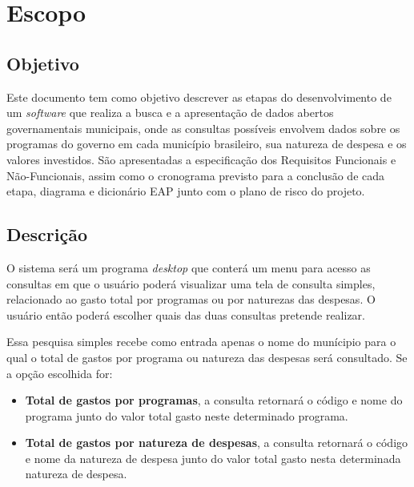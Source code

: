 \documentclass[a4paper,12pt]{article}
\begin{document}


\tableofcontents %

\thispagestyle{empty} %

\newpage
\section{Escopo}
\subsection{Objetivo}

Este documento tem como objetivo descrever as etapas do desenvolvimento de um \textit{software} que realiza a busca e a apresentação de dados abertos governamentais municipais, onde as consultas possíveis envolvem dados sobre os programas do governo em cada município brasileiro, sua natureza de despesa e os valores investidos.
São apresentadas a especificação dos Requisitos Funcionais e Não-Funcionais, assim como o cronograma previsto para a conclusão de cada etapa, diagrama e dicionário EAP junto com o plano de risco do projeto.

\subsection{Descrição}

O sistema será um programa \textit{desktop} que conterá um menu para acesso as consultas em que o usuário poderá visualizar uma tela de consulta simples, relacionado ao gasto total por programas ou por naturezas das despesas. O usuário então poderá escolher quais das duas consultas pretende realizar.

Essa pesquisa simples recebe como entrada apenas o nome do munícipio para o qual o total de gastos por programa ou natureza das despesas será consultado. Se a opção escolhida for:

\begin{itemize}
\item \textbf{Total de gastos por programas}, a consulta retornará o código e nome do programa junto do valor total gasto neste determinado programa. 

\item \textbf{Total de gastos por natureza de despesas}, a consulta retornará o código e nome da natureza de despesa junto do valor total gasto nesta determinada natureza de despesa.

\end{itemize}
\end{document}
